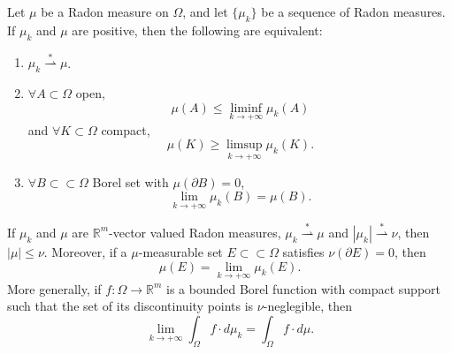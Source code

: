 \begin{lemma} \label{muweak-star} Let $\mu$ be a Radon measure on $\Omega$, and let $\{\mu_{k}\}$ be a sequence of Radon measures.
\\
If $\mu_{k}$ and $\mu$ are positive, then the following are equivalent:
\begin{enumerate}
	\item $\mu_{k} \stackrel {*} {\rightharpoonup} \mu$.
	\item $\forall A \subset \Omega$ open,
\[ \mu(A) \le \liminf\limits_{k \to +\infty} \mu_{k}(A) \]
and $\forall K \subset \Omega$ compact,
\[ \mu(K) \ge \limsup\limits_{k \to +\infty} \mu_{k}(K). \]
	\item $\forall B \subset \subset \Omega$ Borel set with $\mu(\partial B) = 0$,
\[ \lim_{k \to +\infty} \mu_{k}(B) = \mu(B). \]
\end{enumerate}
If $\mu_{k}$ and $\mu$ are $\mathbb{R}^{m}$-vector valued Radon measures, $\mu_{k} \stackrel {*}{\rightharpoonup} \mu$ and $|\mu_{k}| \stackrel {*} {\rightharpoonup} \nu$, then $|\mu| \le \nu$. Moreover, if a $\mu$-measurable set $E \subset \subset \Omega$ satisfies $\nu(\partial E) = 0$, then 
\[ \mu(E) = \lim_{k \to +\infty} \mu_{k}(E).  \]
More generally, if $f : \Omega \to \mathbb{R}^{m}$ is a bounded Borel function with compact support such that the set of its discontinuity points is $\nu$-neglegible, then
\[ \lim_{k \to +\infty} \int_{\Omega} f \cdot d\mu_{k} = \int_{\Omega} f \cdot d\mu.  \]
\end{lemma}
